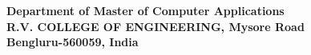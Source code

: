 \begin{center}
\fontsize{14pt}{16.8pt}\selectfont\textbf{Department of Master of Computer Applications  \\
\vspace*{2mm} R.V.  COLLEGE OF ENGINEERING, Mysore Road} \\
\vspace*{2mm}
\fontsize{14pt}{16.8pt}\selectfont\textbf{Bengluru-560059, India} 
\vspace*{10mm}\\

\end{center}
